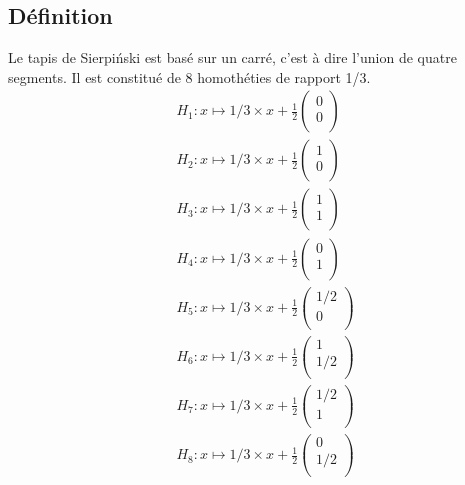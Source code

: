 \documentclass[a4paper, 12pt]{report}
\begin{document}
			\subsection{Définition}
				Le tapis de Sierpiński est basé sur un carré, c'est à dire l'union de quatre segments. Il est constitué de 8 homothéties de rapport 1/3.
				\begin{align*}
					&H_1:x\mapsto 1/3\times x+\frac{1}{2}\left(	\begin{array}{ccc}
																0\\
																0\\
															\end{array}\right)\\
					&H_2:x\mapsto 1/3\times x+\frac{1}{2}\left(	\begin{array}{ccc}
																	1\\
																	0\\
																\end{array}\right)\\
					&H_3:x\mapsto 1/3\times x+\frac{1}{2}\left(	\begin{array}{ccc}
																	1\\
																	1\\
																\end{array}\right)\\
					&H_4:x\mapsto 1/3\times x+\frac{1}{2}\left(	\begin{array}{ccc}
																	0\\
																	1\\
																\end{array}\right)\\
					&H_5:x\mapsto 1/3\times x+\frac{1}{2}\left(	\begin{array}{ccc}
																	1/2\\
																	0\\
																\end{array}\right)\\
					&H_6:x\mapsto 1/3\times x+\frac{1}{2}\left(	\begin{array}{ccc}
																	1\\
																	1/2\\
																\end{array}\right)\\
					&H_7:x\mapsto 1/3\times x+\frac{1}{2}\left(	\begin{array}{ccc}
																	1/2\\
																	1\\
																\end{array}\right)\\
					&H_8:x\mapsto 1/3\times x+\frac{1}{2}\left(	\begin{array}{ccc}
																	0\\
																	1/2\\
																\end{array}\right)
				\end{align*}
\end{document}
